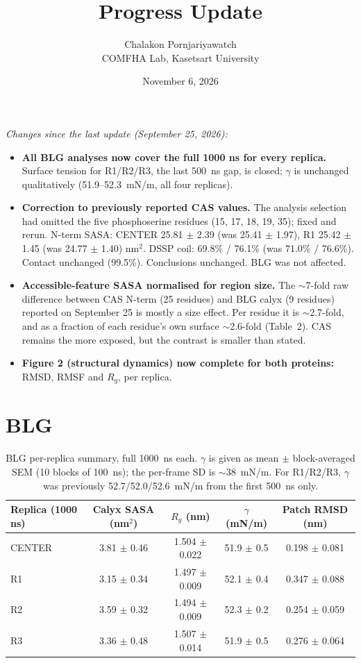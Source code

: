 \documentclass[11pt]{article}
\title{Progress Update}
\author{Chalakon Pornjariyawatch \\ COMFHA Lab, Kasetsart University}
\date{November 6, 2026}
\begin{document}
\maketitle

\noindent\textit{Changes since the last update (September 25, 2026):}
\begin{itemize}[itemsep=2pt]
  \item \textbf{All BLG analyses now cover the full 1000 ns for every replica.} Surface
    tension for R1/R2/R3, the last 500~ns gap, is closed; $\gamma$ is unchanged
    qualitatively (51.9--52.3~mN/m, all four replicas).
  \item \textbf{Correction to previously reported CAS values.} The analysis selection
    had omitted the five phosphoserine residues (15, 17, 18, 19, 35); fixed and rerun.
    N-term SASA: CENTER 25.81 $\pm$ 2.39 (was 25.41 $\pm$ 1.97), R1 25.42 $\pm$ 1.45
    (was 24.77 $\pm$ 1.40) nm$^2$. DSSP coil: 69.8\% / 76.1\% (was 71.0\% / 76.6\%).
    Contact unchanged (99.5\%). Conclusions unchanged. BLG was not affected.
  \item \textbf{Accessible-feature SASA normalised for region size.} The $\sim$7-fold
    raw difference between CAS N-term (25 residues) and BLG calyx (9 residues) reported
    on September 25 is mostly a size effect. Per residue it is $\sim$2.7-fold, and as a
    fraction of each residue's own surface $\sim$2.6-fold (Table~2). CAS remains the more
    exposed, but the contrast is smaller than stated.
  \item \textbf{Figure 2 (structural dynamics) now complete for both proteins:}
    RMSD, RMSF and $R_g$, per replica.
\end{itemize}

\section*{BLG}

\begin{table}[h]
\centering
\small
\begin{tabular}{lcccc}
\toprule
Replica (1000 ns) & Calyx SASA (nm$^2$) & $R_g$ (nm) & $\gamma$ (mN/m) & Patch RMSD (nm) \\
\midrule
CENTER & 3.81 $\pm$ 0.46 & 1.504 $\pm$ 0.022 & 51.9 $\pm$ 0.5 & 0.198 $\pm$ 0.081 \\
R1     & 3.15 $\pm$ 0.34 & 1.497 $\pm$ 0.009 & 52.1 $\pm$ 0.4 & 0.347 $\pm$ 0.088 \\
R2     & 3.59 $\pm$ 0.32 & 1.494 $\pm$ 0.009 & 52.3 $\pm$ 0.2 & 0.254 $\pm$ 0.059 \\
R3     & 3.36 $\pm$ 0.48 & 1.507 $\pm$ 0.014 & 51.9 $\pm$ 0.5 & 0.276 $\pm$ 0.064 \\
\bottomrule
\end{tabular}
\caption{BLG per-replica summary, full 1000~ns each. $\gamma$ is given as mean $\pm$ block-averaged SEM (10 blocks of 100~ns);
the per-frame SD is $\sim$38~mN/m. For R1/R2/R3, $\gamma$ was previously 52.7/52.0/52.6~mN/m
from the first 500~ns only.}
\end{table}
\end{document}
